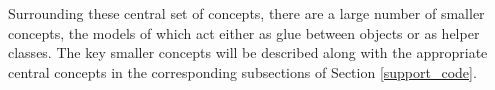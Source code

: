 
Surrounding these central set of concepts, there are a large number of
smaller concepts, the models of which act either as glue between
objects or as helper classes.  The key smaller concepts will be described along
with the appropriate central concepts in the corresponding subsections
of Section \ref{support_code}.




